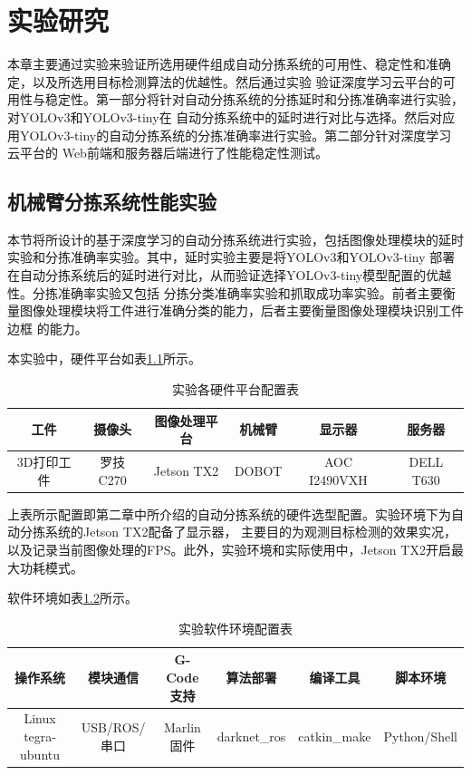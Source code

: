 \chapter{实验研究}

本章主要通过实验来验证所选用硬件组成自动分拣系统的可用性、稳定性和准确定，以及所选用目标检测算法的优越性。然后通过实验
验证深度学习云平台的可用性与稳定性。第一部分将针对自动分拣系统的分拣延时和分拣准确率进行实验，对YOLOv3和YOLOv3-tiny在
自动分拣系统中的延时进行对比与选择。然后对应用YOLOv3-tiny的自动分拣系统的分拣准确率进行实验。第二部分针对深度学习云平台的
Web前端和服务器后端进行了性能稳定性测试。

\section{机械臂分拣系统性能实验}

本节将所设计的基于深度学习的自动分拣系统进行实验，包括图像处理模块的延时实验和分拣准确率实验。其中，延时实验主要是将YOLOv3和YOLOv3-tiny
部署在自动分拣系统后的延时进行对比，从而验证选择YOLOv3-tiny模型配置的优越性。分拣准确率实验又包括
分拣分类准确率实验和抓取成功率实验。前者主要衡量图像处理模块将工件进行准确分类的能力，后者主要衡量图像处理模块识别工件边框
的能力。

本实验中，硬件平台如表\ref{table:exper:hardware}所示。

{
    \begin{table}[htb] 
        \caption{实验各硬件平台配置表}
        \label{table:exper:hardware}
        \centering
        \begin{tabular}[t]{c|c|c|c|c|c}
            \hline
            工件 & 摄像头 & 图像处理平台 & 机械臂 & 显示器 & 服务器  \\
            \hline
            3D打印工件 & 罗技C270 & Jetson TX2 & DOBOT & AOC I2490VXH & DELL T630 \\
            \hline 
        \end{tabular} 
    \end{table}
}

上表所示配置即第二章中所介绍的自动分拣系统的硬件选型配置。实验环境下为自动分拣系统的Jetson TX2配备了显示器，
主要目的为观测目标检测的效果实况，以及记录当前图像处理的FPS。此外，实验环境和实际使用中，Jetson TX2开启最大功耗模式。

软件环境如表\ref{table:exper:software}所示。

{
    \begin{table}[htb] 
        \caption{实验软件环境配置表}
        \label{table:exper:software}
        \centering
        \begin{tabular}[t]{c|c|c|c|c|c}
            \hline
            操作系统 & 模块通信 & G-Code支持 & 算法部署 & 编译工具 & 脚本环境  \\
            \hline
            Linux tegra-ubuntu & USB/ROS/串口 & Marlin固件 & darknet\_ros & catkin\_make & Python/Shell \\
            \hline 
        \end{tabular} 
    \end{table}
}

